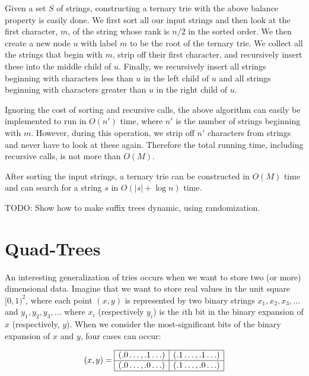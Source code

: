 Given a set $S$ of strings, constructing a ternary trie with the above
balance property is easily done.  We first sort all our input strings
and then look at the first character, $m$, of the string whose rank is
$n/2$ in the sorted order.  We then create a new node $u$ with label
$m$ to be the root of the ternary trie.  We collect all the strings
that begin with $m$, strip off their first character, and recursively
insert these into the middle child of $u$.  Finally, we recursively
insert all strings beginning with characters less than $u$ in the left
child of $u$ and all strings beginning with characters greater than
$u$ in the right child of $u$.

Ignoring the cost of sorting and recursive calls, the above algorithm
can easily be implemented to run in $O(n')$ time, where $n'$ is the
number of strings beginning with $m$.  However, during this operation,
we strip off $n'$ characters from strings and never have to look at
these again.  Therefore the total running time, including recursive
calls, is not more than $O(M)$.

\begin{thm}
After sorting the input strings, a ternary trie can be constructed in
$O(M)$ time and can search for a string $s$ in $O(|s|+\log n)$ time.
\end{thm}

TODO: Show how to make suffix trees dynamic, using randomization.

\section{Quad-Trees}

An interesting generalization of tries occurs when we want to store
two (or more) dimensional data.  Imagine that we want to store real
values in the unit square $[0,1)^2$, where each point $(x,y)$ is
represented by two binary strings $x_1,x_2,x_3,\ldots$ and
$y_1,y_2,y_3,\ldots$ where $x_i$ (respectively $y_i$) is the
$i$th bit in the binary expansion of $x$ (respectively, $y$).  When we
consider the most-significant bits of the binary expansion of $x$ and
$y$, four cases can occur:


\[(x,y) = \begin{array}{|c|c|}\hline
(.0\ldots,.1\ldots) & (.1\ldots,.1\ldots) \\ \hline
(.0\ldots,.0\ldots) & (.1\ldots,.0\ldots) \\ \hline
\end{array}
\]

